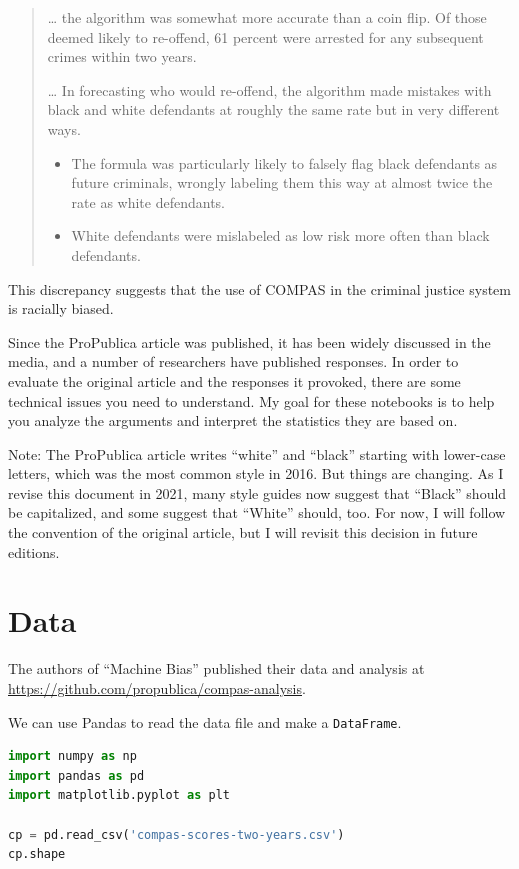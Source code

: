 \begin{quote}
\ldots{} the algorithm was somewhat more accurate than a coin flip. Of
those deemed likely to re-offend, 61 percent were arrested for any
subsequent crimes within two years.

\ldots{} In forecasting who would re-offend, the algorithm made mistakes
with black and white defendants at roughly the same rate but in very
different ways.

\begin{itemize}
\item
  The formula was particularly likely to falsely flag black defendants
  as future criminals, wrongly labeling them this way at almost twice
  the rate as white defendants.
\item
  White defendants were mislabeled as low risk more often than black
  defendants.
\end{itemize}
\end{quote}

This discrepancy suggests that the use of COMPAS in the criminal justice
system is racially biased.

Since the ProPublica article was published, it has been widely discussed
in the media, and a number of researchers have published responses. In
order to evaluate the original article and the responses it provoked,
there are some technical issues you need to understand. My goal for
these notebooks is to help you analyze the arguments and interpret the
statistics they are based on.

Note: The ProPublica article writes ``white'' and ``black'' starting
with lower-case letters, which was the most common style in 2016. But
things are changing. As I revise this document in 2021, many style
guides now suggest that ``Black'' should be capitalized, and some
suggest that ``White'' should, too. For now, I will follow the
convention of the original article, but I will revisit this decision in
future editions.

\hypertarget{data}{%
\section{Data}\label{data}}

The authors of ``Machine Bias'' published their data and analysis at
\url{https://github.com/propublica/compas-analysis}.

We can use Pandas to read the data file and make a
\passthrough{\lstinline!DataFrame!}.

\begin{lstlisting}[language=Python,style=source]
import numpy as np
import pandas as pd
import matplotlib.pyplot as plt

cp = pd.read_csv('compas-scores-two-years.csv')
cp.shape
\end{lstlisting}

